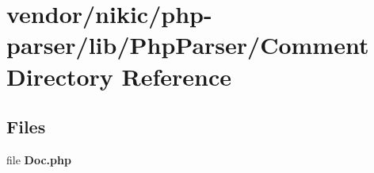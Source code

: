 \section{vendor/nikic/php-\/parser/lib/\+Php\+Parser/\+Comment Directory Reference}
\label{dir_4e33c623b7022d4b29df1a04890eeca5}
\subsection*{Files}
\begin{DoxyCompactItemize}
\item 
file {\bf Doc.\+php}
\end{DoxyCompactItemize}
